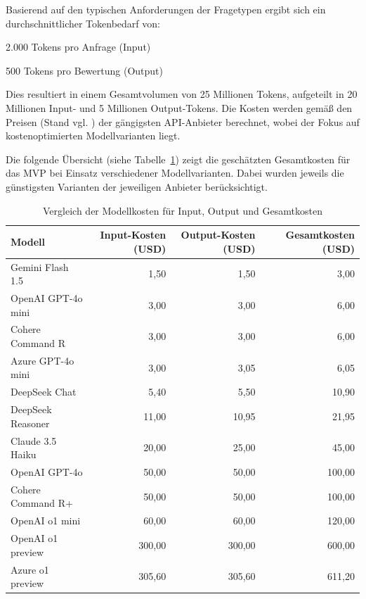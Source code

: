 \documentclass[a4paper,12pt]{article}
\begin{document}
Basierend auf den typischen Anforderungen der Fragetypen ergibt sich ein durchschnittlicher Tokenbedarf von:

2.000 Tokens pro Anfrage (Input)

500 Tokens pro Bewertung (Output)

Dies resultiert in einem Gesamtvolumen von 25 Millionen Tokens, aufgeteilt in 20 Millionen Input- und 5 Millionen Output-Tokens. Die Kosten werden gemäß den Preisen (Stand vgl. \textcite{openai,gemini,cohere,claude,azure,deepseek}) der gängigsten API-Anbieter berechnet, wobei der Fokus auf kostenoptimierten Modellvarianten liegt.

Die folgende Übersicht (siehe Tabelle~\ref{tab:modellkosten}) zeigt die geschätzten Gesamtkosten für das MVP bei Einsatz verschiedener Modellvarianten. Dabei wurden jeweils die günstigsten Varianten der jeweiligen Anbieter berücksichtigt.

\begin{table}[ht]
    \centering
    \small
    \begin{tabular}{|l|r|r|r|}
        \hline
        \textbf{Modell} & \textbf{Input-Kosten (USD)} & \textbf{Output-Kosten (USD)} & \textbf{Gesamtkosten (USD)} \\
        \hline
        Gemini Flash 1.5 & 1{,}50 & 1{,}50 & 3{,}00 \\
        OpenAI GPT-4o mini & 3{,}00 & 3{,}00 & 6{,}00 \\
        Cohere Command R & 3{,}00 & 3{,}00 & 6{,}00 \\
        Azure GPT-4o mini & 3{,}00 & 3{,}05 & 6{,}05 \\
        DeepSeek Chat & 5{,}40 & 5{,}50 & 10{,}90 \\
        DeepSeek Reasoner & 11{,}00 & 10{,}95 & 21{,}95 \\
        Claude 3.5 Haiku & 20{,}00 & 25{,}00 & 45{,}00 \\
        OpenAI GPT-4o & 50{,}00 & 50{,}00 & 100{,}00 \\
        Cohere Command R+ & 50{,}00 & 50{,}00 & 100{,}00 \\
        OpenAI o1 mini & 60{,}00 & 60{,}00 & 120{,}00 \\
        OpenAI o1 preview & 300{,}00 & 300{,}00 & 600{,}00 \\
        Azure o1 preview & 305{,}60 & 305{,}60 & 611{,}20 \\
        \hline
    \end{tabular}
    \caption{Vergleich der Modellkosten für Input, Output und Gesamtkosten}
    \label{tab:modellkosten}
\end{table}
\end{document}
